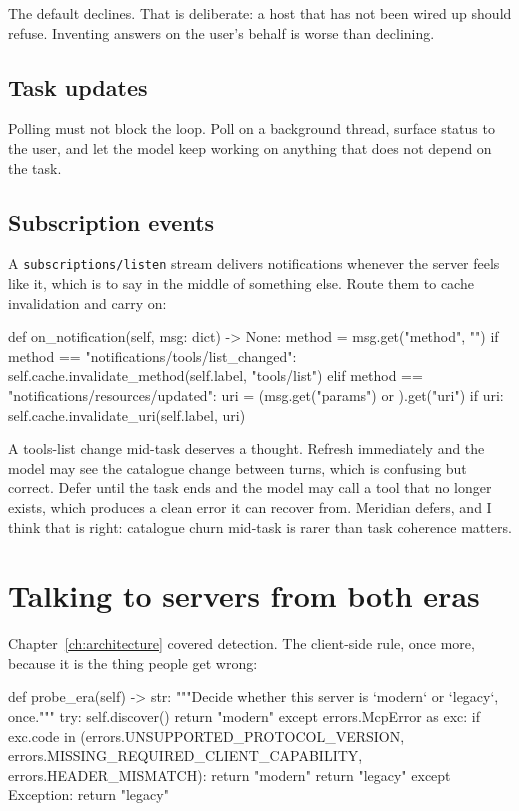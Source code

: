 The default declines. That is deliberate: a host that has not been wired up should refuse. Inventing answers on the
user's behalf is worse than declining.

\subsection{Task updates}

Polling must not block the loop. Poll on a background thread, surface status to
the user, and let the model keep working on anything that does not depend on the
task.

\subsection{Subscription events}

A \texttt{subscriptions/listen} stream delivers notifications whenever the server
feels like it, which is to say in the middle of something else. Route them to
cache invalidation and carry on:

\begin{py}
def on_notification(self, msg: dict) -> None:
    method = msg.get("method", "")
    if method == "notifications/tools/list_changed":
        self.cache.invalidate_method(self.label, "tools/list")
    elif method == "notifications/resources/updated":
        uri = (msg.get("params") or {}).get("uri")
        if uri:
            self.cache.invalidate_uri(self.label, uri)
\end{py}

A tools-list change mid-task deserves a thought. Refresh immediately and the
model may see the catalogue change between turns, which is confusing but
correct. Defer until the task ends and the model may call a tool that no longer
exists, which produces a clean error it can recover from. Meridian defers, and I
think that is right: catalogue churn mid-task is rarer than task coherence
matters.

\section{Talking to servers from both eras}

Chapter~\ref{ch:architecture} covered detection. The client-side rule, once more,
because it is the thing people get wrong:

\begin{py}
def probe_era(self) -> str:
    """Decide whether this server is `modern` or `legacy`, once."""
    try:
        self.discover()
        return "modern"
    except errors.McpError as exc:
        if exc.code in (errors.UNSUPPORTED_PROTOCOL_VERSION,
                        errors.MISSING_REQUIRED_CLIENT_CAPABILITY,
                        errors.HEADER_MISMATCH):
            return "modern"
        return "legacy"
    except Exception:
        return "legacy"
\end{py}

